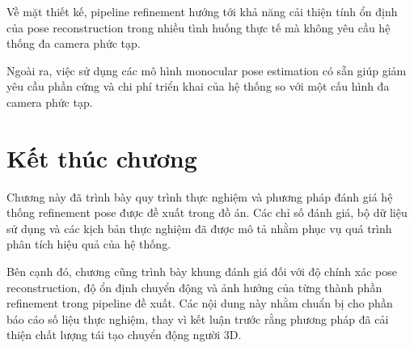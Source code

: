 \documentclass[../DoAn.tex]{subfiles}
\begin{document}
Về mặt thiết kế, pipeline refinement hướng tới khả năng cải thiện tính ổn định của pose reconstruction trong nhiều tình huống thực tế mà không yêu cầu hệ thống đa camera phức tạp.

Ngoài ra, việc sử dụng các mô hình monocular pose estimation có sẵn giúp giảm yêu cầu phần cứng và chi phí triển khai của hệ thống so với một cấu hình đa camera phức tạp.

\section*{Kết thúc chương}

Chương này đã trình bày quy trình thực nghiệm và phương pháp đánh giá hệ thống refinement pose được đề xuất trong đồ án. Các chỉ số đánh giá, bộ dữ liệu sử dụng và các kịch bản thực nghiệm đã được mô tả nhằm phục vụ quá trình phân tích hiệu quả của hệ thống.

Bên cạnh đó, chương cũng trình bày khung đánh giá đối với độ chính xác pose reconstruction, độ ổn định chuyển động và ảnh hưởng của từng thành phần refinement trong pipeline đề xuất. Các nội dung này nhằm chuẩn bị cho phần báo cáo số liệu thực nghiệm, thay vì kết luận trước rằng phương pháp đã cải thiện chất lượng tái tạo chuyển động người 3D.
\end{document}

